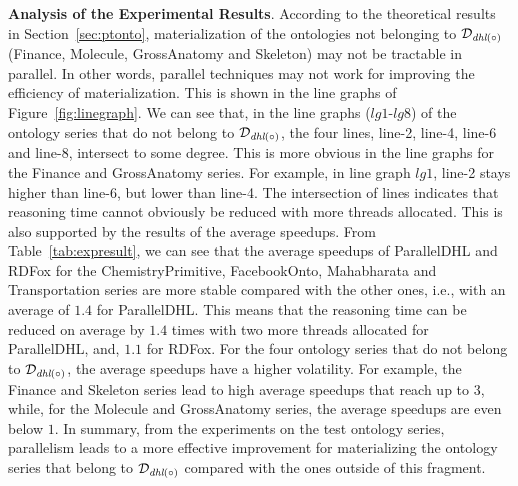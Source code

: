 \textbf{Analysis of the Experimental Results}.
According to the theoretical results in Section~\ref{sec:ptonto},
materialization of the
ontologies not belonging to $\mathcal{D}_{\textit{\text{dhl}}(\circ)}$
(Finance, Molecule, GrossAnatomy and Skeleton)
may not be tractable in parallel. In other words,
parallel techniques may not work for improving the efficiency of materialization.
This is shown in the line graphs of Figure~\ref{fig:linegraph}.
We can see that, in the line graphs ($lg1$-$lg8$) of the ontology series
that do not belong to $\mathcal{D}_{\textit{\text{dhl}}(\circ)}$, the four lines, line-2, line-4, line-6 and line-8,
intersect to some degree. This is more obvious in the line graphs for
the Finance and GrossAnatomy
series. For example, in line graph $lg1$,
line-2 stays higher than line-6, but lower than line-4.
The intersection of lines indicates that reasoning time cannot
obviously be reduced with more threads allocated.
This is also supported by the results of the average speedups.
From Table~\ref{tab:expresult}, we can see that the average speedups of ParallelDHL and RDFox
for the ChemistryPrimitive, FacebookOnto, Mahabharata and Transportation series
are more stable compared with the other ones, i.e., with an average of
$1.4$ for ParallelDHL. This means that the reasoning time can be reduced on average
by $1.4$ times with two more threads allocated 
for ParallelDHL, and, $1.1$ for RDFox. For the four ontology series
that do not belong to $\mathcal{D}_{\textit{\text{dhl}}(\circ)}$,
the average speedups have a higher volatility. For example,
the Finance and Skeleton series lead to high average speedups that reach up to $3$,
while, for the Molecule and GrossAnatomy series, the average speedups are even below $1$.
In summary, from the experiments on the test ontology series,
parallelism leads to a more effective improvement for materializing the ontology series
that belong to $\mathcal{D}_{\textit{\text{dhl}}(\circ)}$ compared
with the ones outside of this fragment.

